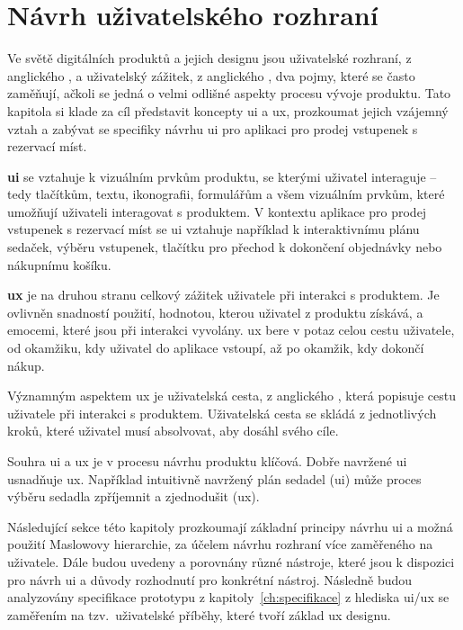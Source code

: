 \chapter{Návrh uživatelského rozhraní}
\label{ch:navrh-uzivatelskeho-rozhrani}
Ve světě digitálních produktů a jejich designu jsou uživatelské rozhraní, z anglického , a uživatelský zážitek, z anglického , dva pojmy, které se často zaměňují, ačkoli se jedná o velmi odlišné aspekty procesu vývoje produktu.
Tato kapitola si klade za cíl představit koncepty \ac{ui} a \ac{ux}, prozkoumat jejich vzájemný vztah a zabývat se specifiky návrhu \ac{ui} pro aplikaci pro prodej vstupenek s rezervací míst.

\textbf{\ac{ui}} se vztahuje k vizuálním prvkům produktu, se kterými uživatel interaguje – tedy tlačítkům, textu, ikonografii, formulářům a všem vizuálním prvkům, které umožňují uživateli interagovat s produktem.
V kontextu aplikace pro prodej vstupenek s rezervací míst se \ac{ui} vztahuje například k interaktivnímu plánu sedaček, výběru vstupenek, tlačítku pro přechod k dokončení objednávky nebo nákupnímu košíku.

\textbf{\ac{ux}} je na druhou stranu celkový zážitek uživatele při interakci s produktem.
Je ovlivněn snadností použití, hodnotou, kterou uživatel z produktu získává, a emocemi, které jsou při interakci vyvolány.
\ac{ux} bere v potaz celou cestu uživatele, od okamžiku, kdy uživatel do aplikace vstoupí, až po okamžik, kdy dokončí nákup.

Významným aspektem \ac{ux} je uživatelská cesta, z anglického , která popisuje cestu uživatele při interakci s produktem.
Uživatelská cesta se skládá z jednotlivých kroků, které uživatel musí absolvovat, aby dosáhl svého cíle.

Souhra \ac{ui} a \ac{ux} je v procesu návrhu produktu klíčová.
Dobře navržené \ac{ui} usnadňuje \ac{ux}.
Například intuitivně navržený plán sedadel (\ac{ui}) může proces výběru sedadla zpříjemnit a zjednodušit (\ac{ux}).

Následující sekce této kapitoly prozkoumají základní principy návrhu \ac{ui} a možná použití Maslowovy hierarchie, za účelem návrhu rozhraní více zaměřeného na uživatele.
Dále budou uvedeny a porovnány různé nástroje, které jsou k dispozici pro návrh \ac{ui} a důvody rozhodnutí pro konkrétní nástroj.
Následně budou analyzovány specifikace prototypu z kapitoly~\ref{ch:specifikace} z hlediska \ac{ui}/\ac{ux} se zaměřením na tzv.\ uživatelské příběhy, které tvoří základ \ac{ux} designu.


